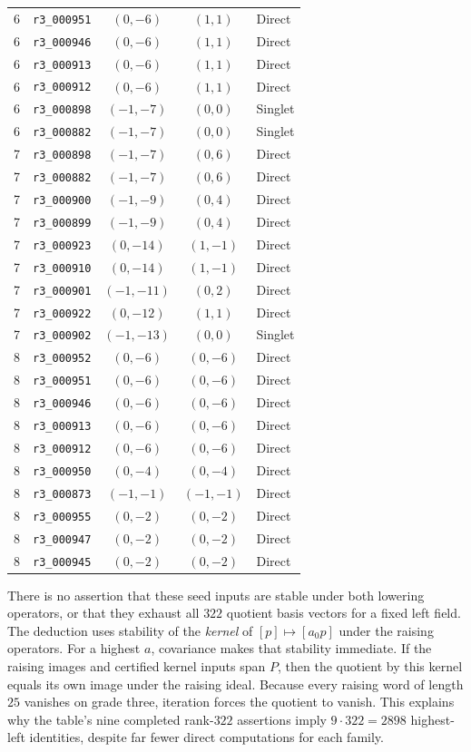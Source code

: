 \begin{longtable}{@{}rlccl@{}}
6 & \texttt{r3\_000951} & $(0,-6)$ & $(1,1)$ & Direct\\
6 & \texttt{r3\_000946} & $(0,-6)$ & $(1,1)$ & Direct\\
6 & \texttt{r3\_000913} & $(0,-6)$ & $(1,1)$ & Direct\\
6 & \texttt{r3\_000912} & $(0,-6)$ & $(1,1)$ & Direct\\
6 & \texttt{r3\_000898} & $(-1,-7)$ & $(0,0)$ & Singlet\\
6 & \texttt{r3\_000882} & $(-1,-7)$ & $(0,0)$ & Singlet\\
7 & \texttt{r3\_000898} & $(-1,-7)$ & $(0,6)$ & Direct\\
7 & \texttt{r3\_000882} & $(-1,-7)$ & $(0,6)$ & Direct\\
7 & \texttt{r3\_000900} & $(-1,-9)$ & $(0,4)$ & Direct\\
7 & \texttt{r3\_000899} & $(-1,-9)$ & $(0,4)$ & Direct\\
7 & \texttt{r3\_000923} & $(0,-14)$ & $(1,-1)$ & Direct\\
7 & \texttt{r3\_000910} & $(0,-14)$ & $(1,-1)$ & Direct\\
7 & \texttt{r3\_000901} & $(-1,-11)$ & $(0,2)$ & Direct\\
7 & \texttt{r3\_000922} & $(0,-12)$ & $(1,1)$ & Direct\\
7 & \texttt{r3\_000902} & $(-1,-13)$ & $(0,0)$ & Singlet\\
8 & \texttt{r3\_000952} & $(0,-6)$ & $(0,-6)$ & Direct\\
8 & \texttt{r3\_000951} & $(0,-6)$ & $(0,-6)$ & Direct\\
8 & \texttt{r3\_000946} & $(0,-6)$ & $(0,-6)$ & Direct\\
8 & \texttt{r3\_000913} & $(0,-6)$ & $(0,-6)$ & Direct\\
8 & \texttt{r3\_000912} & $(0,-6)$ & $(0,-6)$ & Direct\\
8 & \texttt{r3\_000950} & $(0,-4)$ & $(0,-4)$ & Direct\\
8 & \texttt{r3\_000873} & $(-1,-1)$ & $(-1,-1)$ & Direct\\
8 & \texttt{r3\_000955} & $(0,-2)$ & $(0,-2)$ & Direct\\
8 & \texttt{r3\_000947} & $(0,-2)$ & $(0,-2)$ & Direct\\
8 & \texttt{r3\_000945} & $(0,-2)$ & $(0,-2)$ & Direct\\
\end{longtable}
\endgroup
There is no assertion that these seed inputs are stable under both
lowering operators, or that they exhaust all $322$ quotient basis
vectors for a fixed left field. The deduction uses stability of the
\emph{kernel} of $[p]\mapsto[a_0p]$ under the raising operators.
For a highest $a$, covariance makes that stability immediate. If the
raising images and certified kernel inputs span $P$, then the quotient
by this kernel equals its own image under the raising ideal. Because
every raising word of length $25$ vanishes on grade three, iteration
forces the quotient to vanish. This explains why the table's nine
completed rank-$322$ assertions imply $9\cdot322=2898$ highest-left
identities, despite far fewer direct computations for each family.


